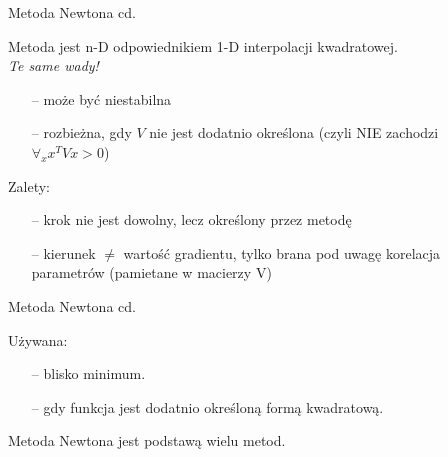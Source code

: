   \begin{frame}{Metoda Newtona cd.}

    \begin{block}{}
    Metoda jest n-D odpowiednikiem 1-D interpolacji kwadratowej.
      \smallskip
	  \\ \emph{Te same wady!}
	  \begin{itemize}
	  	\item[--] może być niestabilna
	  	\item[--] rozbieżna, gdy $V$ nie jest dodatnio określona (czyli NIE zachodzi $\forall_{x} x^TVx>0$)
	  \end{itemize}
	\end{block}
    \begin{block}{Zalety:}
      \begin{itemize}
	  	\item[--] krok nie jest dowolny, lecz określony przez metodę
	  	\item[--] kierunek $\neq$ wartość gradientu, tylko brana pod uwagę korelacja parametrów (pamietane w macierzy V)
	  \end{itemize}
	\end{block}

  \end{frame}

  \begin{frame}{Metoda Newtona cd.}

	\begin{block}{Używana:}
      \begin{itemize}
	  	\item[--] blisko minimum.
	  	\item[--] gdy funkcja jest dodatnio określoną formą kwadratową.
	  \end{itemize}
	\end{block}
	\begin{block}{}
	    Metoda Newtona jest podstawą wielu metod.
	\end{block}

  \end{frame}


